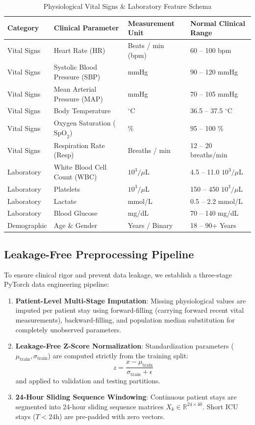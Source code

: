 \documentclass[11pt,a4paper]{article}
\begin{document}
\begin{table}[htbp]
\caption{Physiological Vital Signs \& Laboratory Feature Schema}
\label{tab:vitals_schema_springer}
\centering
\small
\setlength{\tabcolsep}{4pt}
\begin{tabular}{llll}
\toprule
\textbf{Category} & \textbf{Clinical Parameter} & \textbf{Measurement Unit} & \textbf{Normal Clinical Range} \\
\midrule
Vital Signs & Heart Rate (HR) & Beats / min (bpm) & 60 -- 100 bpm \\
Vital Signs & Systolic Blood Pressure (SBP) & mmHg & 90 -- 120 mmHg \\
Vital Signs & Mean Arterial Pressure (MAP) & mmHg & 70 -- 105 mmHg \\
Vital Signs & Body Temperature & $^\circ$C & 36.5 -- 37.5 $^\circ$C \\
Vital Signs & Oxygen Saturation ($\text{SpO}_2$) & \% & 95 -- 100 \% \\
Vital Signs & Respiration Rate (Resp) & Breaths / min & 12 -- 20 breaths/min \\
Laboratory & White Blood Cell Count (WBC) & $10^3/\mu\text{L}$ & 4.5 -- 11.0 $10^3/\mu\text{L}$ \\
Laboratory & Platelets & $10^3/\mu\text{L}$ & 150 -- 450 $10^3/\mu\text{L}$ \\
Laboratory & Lactate & mmol/L & 0.5 -- 2.2 mmol/L \\
Laboratory & Blood Glucose & mg/dL & 70 -- 140 mg/dL \\
Demographic & Age \& Gender & Years / Binary & 18 -- 90+ Years \\
\bottomrule
\end{tabular}
\end{table}

\subsection{Leakage-Free Preprocessing Pipeline}
To ensure clinical rigor and prevent data leakage, we establish a three-stage PyTorch data engineering pipeline:
\begin{enumerate}
\item \textbf{Patient-Level Multi-Stage Imputation}: Missing physiological values are imputed per patient stay using forward-filling (carrying forward recent vital measurements), backward-filling, and population median substitution for completely unobserved parameters.
\item \textbf{Leakage-Free Z-Score Normalization}: Standardization parameters ($\mu_{\text{train}}, \sigma_{\text{train}}$) are computed strictly from the training split:
$$z = \frac{x - \mu_{\text{train}}}{\sigma_{\text{train}} + \epsilon}$$
and applied to validation and testing partitions.
\item \textbf{24-Hour Sliding Sequence Windowing}: Continuous patient stays are segmented into 24-hour sliding sequence matrices $X_k \in \mathbb{R}^{24 \times 40}$. Short ICU stays ($T < 24$h) are pre-padded with zero vectors.
\end{enumerate}
\end{document}
